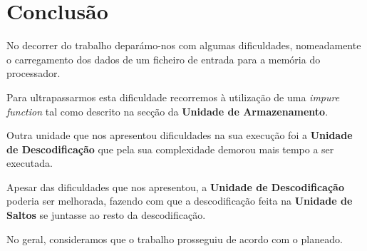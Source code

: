 \chapter{Conclusão}
No decorrer do trabalho deparámo-nos com algumas dificuldades, nomeadamente o carregamento dos dados de um ficheiro de entrada para a memória do processador.\par
Para ultrapassarmos esta dificuldade recorremos à utilização de uma \textit{impure function} tal como descrito na secção da \textbf{Unidade de Armazenamento}.\par
Outra unidade que nos apresentou dificuldades na sua execução foi a \textbf{Unidade de Descodificação} que pela sua complexidade demorou mais tempo a ser executada.\par
Apesar das dificuldades que nos apresentou, a \textbf{Unidade de Descodificação} poderia ser melhorada, fazendo com que a descodificação feita na \textbf{Unidade de Saltos} se juntasse ao resto da descodificação.\par
No geral, consideramos que o trabalho prosseguiu de acordo com o planeado.